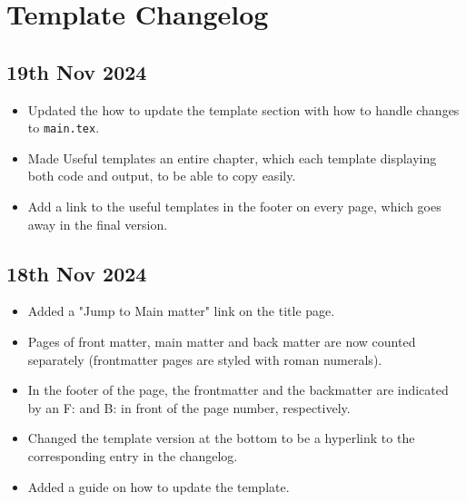 \chapter*{Template Changelog}

\section*{19th Nov 2024} \label{sec:changelog:2024/11/19}
\begin{itemize}
    \item Updated the how to update the template section with how to handle changes to \verb|main.tex|.
    \item Made Useful templates an entire chapter, which each template displaying both code and output, to be able to copy easily.
    \item Add a link to the useful templates in the footer on every page, which goes away in the final version.
\end{itemize}

\section*{18th Nov 2024} \label{sec:changelog:2024/11/18}
\begin{itemize}
    \item Added a "Jump to Main matter" link on the title page.
    \item Pages of front matter, main matter and back matter are now counted separately (frontmatter pages are styled with roman numerals).
    \item In the footer of the page, the frontmatter and the backmatter are indicated by an F: and B: in front of the page number, respectively.
    \item Changed the template version at the bottom to be a hyperlink to the corresponding entry in the changelog.
    \item Added a guide on how to update the template.
\end{itemize}